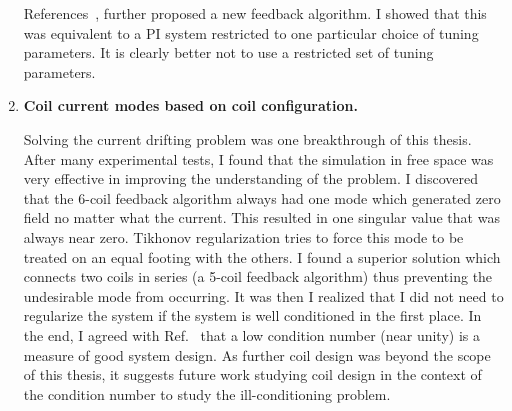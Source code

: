 \begin{enumerate}
References~\cite{rawlik,rawlikpriv}, further proposed a new feedback algorithm. I showed that this was equivalent to a PI system restricted to one particular choice of tuning parameters. It is clearly better not to use a restricted set of tuning parameters.



\item {\bf Coil current modes based on coil configuration.}  

Solving the current drifting problem was one breakthrough of this thesis. After many experimental tests, I found that the simulation in free space was very effective in improving the understanding of the problem. I discovered that the 6-coil feedback algorithm always had one mode which generated zero field no matter what the current. This resulted in one singular value that was always near zero. Tikhonov regularization tries to force this mode to be treated on an equal footing with the others. I found a superior solution which connects two coils in series (a 5-coil feedback algorithm) thus preventing the undesirable mode from occurring. It was then I realized that I did not need to regularize the system if the system is well conditioned in the first place. In the end, I agreed with Ref.~\cite{rawlik} that a low condition number (near unity) is a measure of good system design. As further coil design was beyond the scope of this thesis, it suggests future work studying coil design in the context of the condition number to study the ill-conditioning problem.

\end{enumerate}



